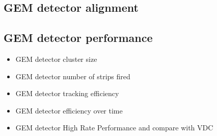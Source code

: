\subsection{GEM detector alignment}
\subsection{GEM detector performance}
\begin{itemize}
    \item GEM detector cluster size
    \item GEM detector number of strips fired
    \item GEM detector tracking efficiency
    \item GEM detector efficiency over time 
    \item GEM detector High Rate Performance and compare with VDC 
\end{itemize}
